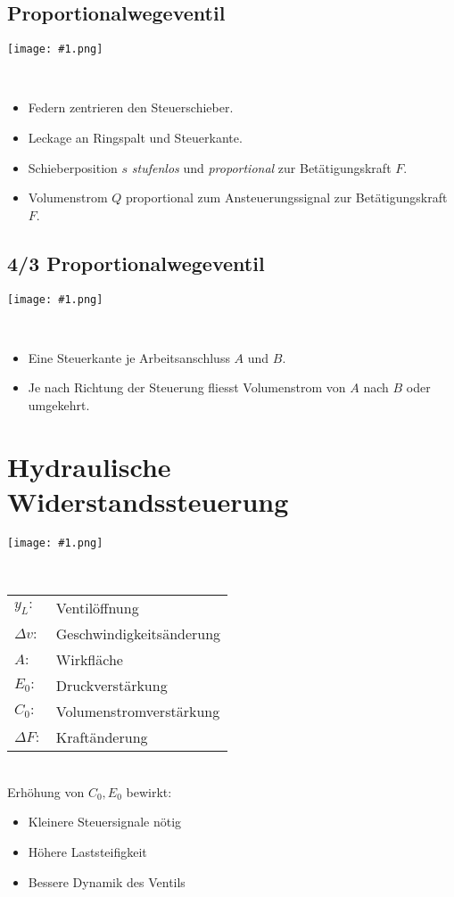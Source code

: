\documentclass[landscape,a4paper,10pt]{article}
\newcommand{\graphicsm}[1]{
\noindent
\begin{minipage}{\columnwidth}
\centering
\texttt{[image: \#1.png]}
\end{minipage} 
\medskip 
\\
}
\newcommand{\graphiccol}[1]{
\noindent
\begin{minipage}{\columnwidth}
\centering
\texttt{[image: \#1.png]}
\end{minipage}
\medskip \\
}
\begin{document}
\begin{multicols*}{3}
\subsection{Proportionalwegeventil}
\graphiccol{proportionalwegeventil}
\begin{itemize}
\item Federn zentrieren den Steuerschieber.
\item Leckage an Ringspalt und Steuerkante.
\item Schieberposition $s$ \emph{stufenlos} und \emph{proportional} zur Betätigungskraft $F$.
\item Volumenstrom $Q$ proportional zum Ansteuerungssignal zur Betätigungskraft $F$. 
\end{itemize}



\subsection{4/3 Proportionalwegeventil}
\graphiccol{proportionalwegeventil2}
\begin{itemize}
\item Eine Steuerkante je Arbeitsanschluss $A$ und $B$. 
\item Je nach Richtung der Steuerung fliesst Volumenstrom von $A$ nach $B$ oder umgekehrt. 
\end{itemize}


\vfill
\newpage

\section{Hydraulische Widerstandssteuerung}
\graphicsm{signalumsetzung}

\begin{tabular}{ll}
$y_L:$ & Ventilöffnung \\
$\Delta v:$ & Geschwindigkeitsänderung \\
$A:$ & Wirkfläche \\
$E_0:$ & Druckverstärkung \\
$C_0:$ & Volumenstromverstärkung \\
$\Delta F:$ & Kraftänderung
\end{tabular} \\

Erhöhung von $C_0, E_0$ bewirkt:
\begin{itemize}
\item Kleinere Steuersignale nötig 
\item Höhere Laststeifigkeit 
\item Bessere Dynamik des Ventils
\end{itemize}



\end{multicols*}
\end{document}
